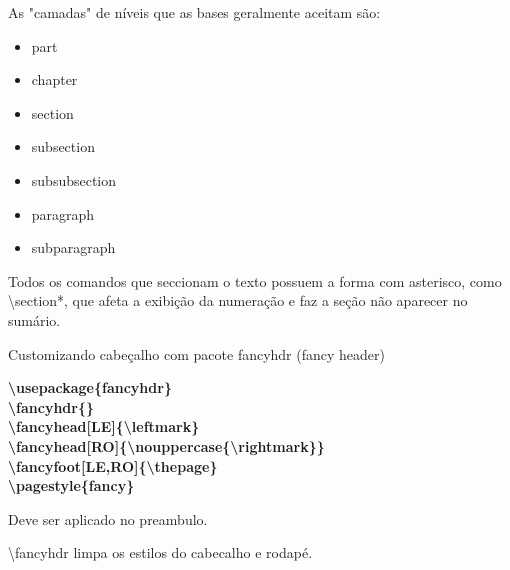 \documentclass[a4paper, 12pts]{book}
\begin{document}
As "camadas" de níveis que as bases geralmente aceitam são:
\begin{itemize}
    \item part
    \item chapter
    \item section
    \item subsection
    \item subsubsection
    \item paragraph
    \item subparagraph
\end{itemize}

Todos os comandos que seccionam o texto possuem a forma
com asterisco, como \textbackslash section*, que afeta a exibição
da numeração e faz a seção não aparecer no sumário.

Customizando cabeçalho com pacote fancyhdr (fancy header)

\textbf{
    \textbackslash usepackage\{fancyhdr\}\\
    \textbackslash fancyhdr\{\} \\
    \textbackslash fancyhead[LE]\{\textbackslash leftmark\} \\
    \textbackslash fancyhead[RO]\{\textbackslash nouppercase\{\textbackslash rightmark\}\} \\
    \textbackslash fancyfoot[LE,RO]\{\textbackslash thepage\} \\
    \textbackslash pagestyle\{fancy\} 
}

Deve ser aplicado no preambulo.

\textbackslash fancyhdr limpa os estilos do cabecalho e rodapé.
\end{document}
